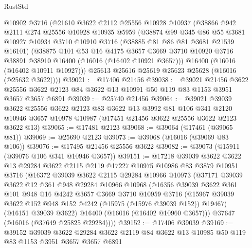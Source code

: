 \begin{lexlean}{RustStd}
\begin{coremodule}
    @10902
    @3716
    (@21610
      @3622
      @2112
      @25556
      @10928
      @10937
      (@38866
        @942
        @2111
        @274
        @25556
        @10928
        @10935
        @5959
        (@38874
          @99
          @345
          @86
          @55
          @3681
          @10927
          @10934
          @3710
          @10910
          @3716
          (@38885 @81 @86 @81 @3681 @21539 @16101)
          (@38875
            @101
            @53
            @16
            @4175
            @3657
            @3669
            @3710
            @10920
            @3716
            @38891
            @38910
            @16400
            (@16016 (@16402 @10921 @3657)))
          @16400
          (@16016 (@16402 @10911 @10927)))
        @25613
        @25616
        @25619
        @25623
        @25628
        (@16016 (@25632 @3622))))
@39021 := @17406 @21456
@39038 := @39021
    @21456
    @3622
    @25556
    @3622
    @2123
    @84
    @3622
    @13
    @10991
    @50
    @119
    @83
    @1153
    @3951
    @3657
    @3657
    @6891
@39039 := @25740 @21456
@39064 := @39021
    @39039
    @3622
    @25556
    @3622
    @2123
    @83
    @3622
    @13
    @3992
    @81
    @106
    @341
    @2120
    @10946
    @3657
    @10978
    @10987
    (@17451 @21456 @3622 @25556 @3622 @2123 @3622 @13)
@39065 := @17481 @2123
@39068 := @39064 (@17461 (@39065 @81))
@39069 := @25690 @2123
@39073 := @39068 (@16016 (@39069 @83 @106))
@39076 := @17495 @21456 @25556 @3622
@39082 := @39073 (@15911 (@39076 @106 @341 @10946 @3657))
@39151 := @17218
    @39039
    @3622
    @3622
    @13
    @29284
    @3622
    @2115
    @2119
    @17227
    @10975
    @10986
    @83
    @3879
    @10951
    @3716
    (@16372
      @39039
      @3622
      @2115
      @29284
      @10966
      @10973
      (@37171
        @39039
        @3622
        @12
        @361
        @948
        @29284
        @10966
        @10968
        (@16356
          @39039
          @3622
          @361
          @101
          @948
          @16
          @4242
          @3657
          @3669
          @3710
          @10959
          @3716
          (@15967 @39039 @3622 @152 @948 @152 @4242 (@15975 (@15976 @39039 @152)) @19467)
          (@16151 @39039 @3622)
          @16400
          (@16016 (@16402 @10960 @3657)))
        @37647
        (@16016 (@37649 @25825 @29284))))
@39152 := @17406 @39039
@39169 := @39152
    @39039
    @3622
    @29284
    @3622
    @2119
    @84
    @3622
    @13
    @10985
    @50
    @119
    @83
    @1153
    @3951
    @3657
    @3657
    @6891

\end{coremodule}
\end{lexlean}
